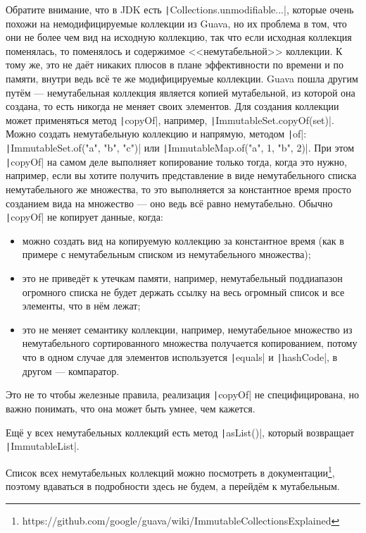 \documentclass[a5paper,draft]{article}
\begin{document}
Обратите внимание, что в JDK есть \texttt|Collections.unmodifiable...|, которые очень похожи на немодифицируемые коллекции из Guava, но их проблема в том, что они не более чем вид на исходную коллекцию, так что если исходная коллекция поменялась, то поменялось и содержимое <<немутабельной>> коллекции. К тому же, это не даёт никаких плюсов в плане эффективности по времени и по памяти, внутри ведь всё те же модифицируемые коллекции. Guava пошла другим путём --- немутабельная коллекция является копией мутабельной, из которой она создана, то есть никогда не меняет своих элементов. Для создания коллекции может применяться метод \texttt|copyOf|, например, \texttt|ImmutableSet.copyOf(set)|. Можно создать немутабельную коллекцию и напрямую, методом \texttt|of|: \texttt|ImmutableSet.of("a", "b", "c")| или \texttt|ImmutableMap.of("a", 1, "b", 2)|. При этом \texttt|copyOf| на самом деле выполняет копирование только тогда, когда это нужно, например, если вы хотите получить представление в виде немутабельного списка немутабельного же множества, то это выполняется за константное время просто созданием вида на множество --- оно ведь всё равно немутабельно. Обычно \texttt|copyOf| не копирует данные, когда:
\begin{itemize}
	\item можно создать вид на копируемую коллекцию за константное время (как в примере с немутабельным списком из немутабельного множества);
	\item это не приведёт к утечкам памяти, например, немутабельный поддиапазон огромного списка не будет держать ссылку на весь огромный список и все элементы, что в нём лежат;
	\item это не меняет семантику коллекции, например, немутабельное множество из немутабельного сортированного множества получается копированием, потому что в одном случае для элементов используется \texttt|equals| и \texttt|hashCode|, в другом --- компаратор.
\end{itemize}

Это не то чтобы железные правила, реализация \texttt|copyOf| не специфицирована, но важно понимать, что она может быть умнее, чем кажется. 

Ещё у всех немутабельных коллекций есть метод \texttt|asList()|, который возвращает \texttt|ImmutableList|.

Список всех немутабельных коллекций можно посмотреть в документации\footnote{https://github.com/google/guava/wiki/ImmutableCollectionsExplained}, поэтому вдаваться в подробности здесь не будем, а перейдём к мутабельным.
\end{document}

